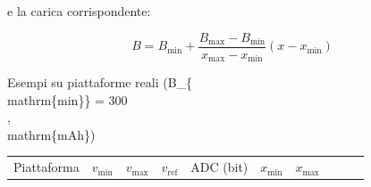 \documentclass[
  italian,
  openany]{book}
\newcounter{none} %
\begin{document}
e la carica corrispondente:

\[B = B_{\mathrm{min}} + \frac{B_{\mathrm{max}} - B_{\mathrm{min}}}{x_{\mathrm{max}} - x_{\mathrm{min}}}(x - x_{\mathrm{min}})\]

\begin{callouttip}{Esempi su piattaforme reali (B\_\{\\mathrm\{min\}\} = 300\\,\\mathrm\{mAh\})}

{\def\LTcaptype{none} %
\begin{longtable}[]{@{}
  >{\raggedright\arraybackslash}p{}
  >{\raggedright\arraybackslash}p{}
  >{\raggedright\arraybackslash}p{}
  >{\raggedright\arraybackslash}p{}
  >{\raggedright\arraybackslash}p{}
  >{\raggedright\arraybackslash}p{}
  >{\raggedright\arraybackslash}p{}
  >{\raggedright\arraybackslash}p{}
  >{\raggedright\arraybackslash}p{}
  >{\raggedright\arraybackslash}p{}@{}}
\toprule\noalign{}
\begin{minipage}[b]{\linewidth}\raggedright
Piattaforma
\end{minipage} & \begin{minipage}[b]{\linewidth}\raggedright
\(v_{\mathrm{min}}\)
\end{minipage} & \begin{minipage}[b]{\linewidth}\raggedright
\(v_{\mathrm{max}}\)
\end{minipage} & \begin{minipage}[b]{\linewidth}\raggedright
\(v_{\mathrm{ref}}\)
\end{minipage} & \begin{minipage}[b]{\linewidth}\raggedright
ADC (bit)
\end{minipage} & \begin{minipage}[b]{\linewidth}\raggedright
\(x_{\mathrm{min}}\)
\end{minipage} & \begin{minipage}[b]{\linewidth}\raggedright
\(x_{\mathrm{max}}\)
\end{minipage} & \begin{minipage}[b]{\linewidth}\raggedright

\end{minipage}
\end{longtable}}
\end{callouttip}
\end{document}
